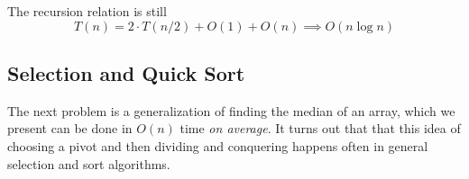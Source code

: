 \documentclass{article}
\begin{document}
\begin{algo}
\begin{algorithm}[H]
\begin{algorithmic}
            \State {}
          \EndFunction
        \end{algorithmic}
      \end{algorithm}
      The recursion relation is still 
      \begin{equation}
        T(n) = 2 \cdot T(n/2) + O(1) + O(n) \implies O(n \log{n})
      \end{equation}
    \end{algo}

  \subsection{Selection and Quick Sort} 
  
    The next problem is a generalization of finding the median of an array, which we present can be done in $O(n)$ time \textit{on average}. It turns out that that this idea of choosing a pivot and then dividing and conquering happens often in general selection and sort algorithms.    
\end{document}
